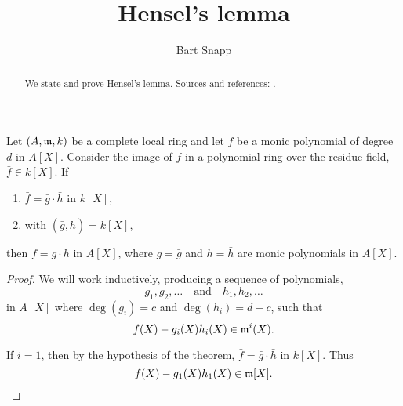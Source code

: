 \documentclass{ximera}
\author{Bart Snapp}
\title{Hensel's lemma}
\begin{document}
\begin{abstract}
  We state and prove Hensel's lemma. Sources and references:
  \cite{rA2006}.
\end{abstract}
\maketitle

\begin{theorem}
  Let $(A,\mathfrak{m},k)$ be a complete local ring and let $f$ be a monic
  polynomial of degree $d$ in $A[X]$. Consider the image of $f$ in a
  polynomial ring over the residue field, $\bar{f}\in k[X]$. If
  \begin{enumerate}
  \item $\bar{f} = \bar{g}\cdot \bar{h}$ in $k[X]$,
  \item with $(\bar{g},\bar{h}) = k[X]$,
  \end{enumerate}
  then $f = g\cdot h$ in $A[X]$, where $g= \bar{g}$ and $h=\bar{h}$
  are monic polynomials in $A[X]$.
  \begin{proof}
    We will work inductively, producing a sequence of polynomials,
    \[
    g_1,g_2,\dots \quad\text{and}\quad h_1,h_2,\dots
    \]
    in $A[X]$ where $\deg(g_i) = c$ and $\deg(h_i) = d-c$, such that
    \[
    f(X) - g_i(X) h_i(X) \in \mathfrak{m}^i(X).
    \]

    
    If $i=1$, then by the hypothesis of the theorem, $\bar{f} =
    \bar{g}\cdot \bar{h}$ in $k[X]$. Thus
    \[
    f(X) - g_1(X) h_1(X) \in \mathfrak{m}[X].
    \]


\end{proof}
\end{theorem}
\end{document}
